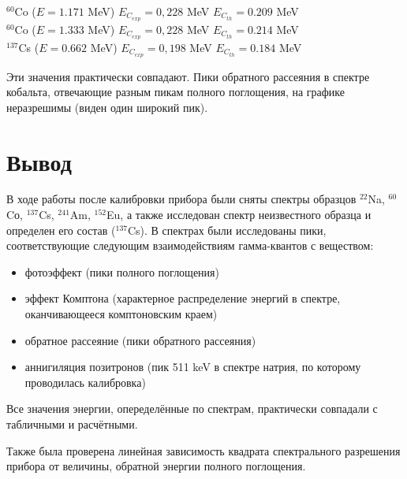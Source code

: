 \documentclass[a4paper]{article}
\begin{document}
\begin{enumerate}
\begin{center}
  $^{60}$Co ($E = 1.171$ MeV) \hspace{1cm} $E_C_{exp} = 0,228$ MeV \hspace{1cm} $E_C_{th} = 0.209$ MeV \\
    $^{60}$Co ($E = 1.333$ MeV)\hspace{1cm} $E_C_{exp} = 0,228$ MeV \hspace{1cm} $E_C_{th} = 0.214$ MeV \\
$^{137}$Cs ($E = 0.662$ MeV)\hspace{1cm} $E_C_{exp} =0,198$ MeV \hspace{1cm} $E_C_{th} = 0.184$ MeV \\
\end{center}

Эти значения практически совпадают. Пики обратного рассеяния в спектре кобальта, отвечающие разным пикам полного поглощения, на графике неразрешимы (виден один широкий пик).

\end{enumerate}

\section{Вывод}

В ходе работы после калибровки прибора были сняты спектры образцов $^{22}$Na,  $^{60}$Cо,  $^{137}$Cs, $^{241}$Am, $^{152}$Eu, а также исследован спектр неизвестного образца и определен его состав ($^{137}$Cs). В спектрах были исследованы пики, соответствующие следующим взаимодействиям гамма-квантов с веществом:
\begin{itemize}
    \item фотоэффект (пики полного поглощения)
    \item эффект Комптона (характерное распределение энергий в спектре, оканчивающееся комптоновским краем)
    \item обратное рассеяние (пики обратного рассеяния)
    \item аннигиляция позитронов (пик 511 keV в спектре натрия, по которому проводилась калибровка)
\end{itemize}

Все значения энергии, опеределённые по спектрам, практически совпадали с табличными и расчётными. \par

Также была проверена линейная зависимость квадрата спектрального разрешения прибора от величины, обратной энергии полного поглощения.
\end{document}
